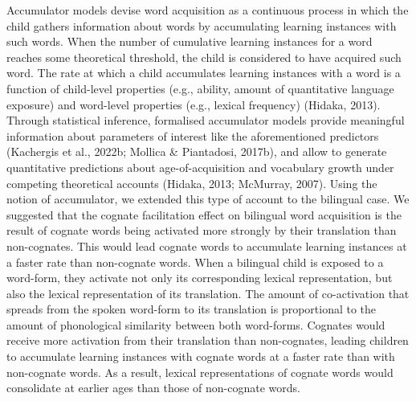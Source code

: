 \documentclass[
  12pt,
  b5paperpaper,
  twoside]{scrreprt}
\begin{document}
Accumulator models devise word acquisition as a continuous process in
which the child gathers information about words by accumulating learning
instances with such words. When the number of cumulative learning
instances for a word reaches some theoretical threshold, the child is
considered to have acquired such word. The rate at which a child
accumulates learning instances with a word is a function of child-level
properties (e.g., ability, amount of quantitative language exposure) and
word-level properties (e.g., lexical frequency) (Hidaka, 2013). Through
statistical inference, formalised accumulator models provide meaningful
information about parameters of interest like the aforementioned
predictors (Kachergis et al., 2022b; Mollica \& Piantadosi, 2017b), and
allow to generate quantitative predictions about age-of-acquisition and
vocabulary growth under competing theoretical accounts (Hidaka, 2013;
McMurray, 2007). Using the notion of accumulator, we extended this type
of account to the bilingual case. We suggested that the cognate
facilitation effect on bilingual word acquisition is the result of
cognate words being activated more strongly by their translation than
non-cognates. This would lead cognate words to accumulate learning
instances at a faster rate than non-cognate words. When a bilingual
child is exposed to a word-form, they activate not only its
corresponding lexical representation, but also the lexical
representation of its translation. The amount of co-activation that
spreads from the spoken word-form to its translation is proportional to
the amount of phonological similarity between both word-forms. Cognates
would receive more activation from their translation than non-cognates,
leading children to accumulate learning instances with cognate words at
a faster rate than with non-cognate words. As a result, lexical
representations of cognate words would consolidate at earlier ages than
those of non-cognate words.
\end{document}
